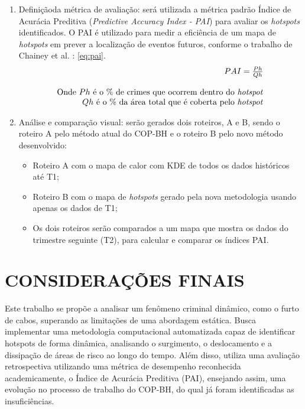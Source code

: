 \begin{enumerate}
  \item{Definiçãoda métrica de avaliação: será utilizada a métrica padrão Índice de Acurácia Preditiva (\textit{Predictive Accuracy Index - PAI}) para avaliar os \textit{hotspots} identificados. O PAI é utilizado para medir a eficiência de um mapa de \textit{hotspots} em prever a localização de eventos futuros, conforme o trabalho de Chainey et al. \cite{Chainey2008}: \ref{eq:pai}.\\  }
  \begin{equation} \label{eq:pai}
    \begin{array}{rcl}
      PAI = \frac{Ph}{Qh} \\ \\
      \text{Onde } Ph \text{ é o \% de crimes que ocorrem dentro do \textit{hotspot}} \\
      Qh \text{ é o \% da área total que é coberta pelo \textit{hotspot}} \\
    \end{array}
  \end{equation}
  \item{Análise e comparação visual: serão gerados dois roteiros, A e B, sendo o roteiro A pelo método atual do COP-BH e o roteiro B pelo novo método desenvolvido:}
  \begin{itemize}
    \item{Roteiro A com o mapa de calor com KDE de todos os dados históricos até T1;}
    \item{Roteiro B com o mapa de \textit{hotspots} gerado pela nova metodologia usando apenas os dados de T1;}
    \item{Os dois roteiros serão comparados a um mapa que mostra os dados do trimestre seguinte (T2), para calcular e comparar os índices PAI.}
  \end{itemize}
\end{enumerate}

\section{CONSIDERAÇÕES FINAIS} %
\label{sec:conclusao}
Este trabalho se propõe a  analisar um fenômeno criminal dinâmico, como o furto de cabos, superando as limitações de uma abordagem estática. Busca implementar uma metodologia computacional automatizada capaz de identificar hotspots de forma dinâmica, analisando o surgimento, o deslocamento e a dissipação de áreas de risco ao longo do tempo. Além disso, utiliza uma avaliação retrospectiva utilizando uma métrica de desempenho reconhecida academicamente, o Índice de Acurácia Preditiva (PAI), ensejando assim, uma evolução no processo de trabalho do COP-BH, do qual já foram identificadas as insuficiências.

